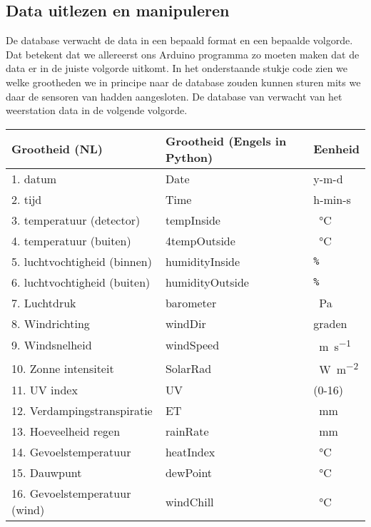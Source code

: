 \subsection{Data uitlezen en manipuleren} De \hisparc database verwacht
de data in een bepaald format en een bepaalde volgorde. Dat betekent dat
we allereerst ons Arduino programma zo moeten maken dat de data er in de
juiste volgorde uitkomt.
In het onderstaande stukje code zien we welke grootheden we in principe naar de 
\hisparc database zouden kunnen sturen mits we daar de sensoren van hadden aangesloten.
De database van \hisparc verwacht van het weerstation data in de volgende 
volgorde. 

\begin{center}
\begin{table}
    \begin{tabular}{ | l | l | l|}
    \hline
    Grootheid (NL)& Grootheid (Engels in Python) & Eenheid  \\ \hline
    1. datum & Date   & y-m-d  \\ \hline
    2. tijd & Time    & h-min-s   \\ \hline
    3. temperatuur (detector) & tempInside & \SI{}{\celsius}    \\ \hline
    4. temperatuur (buiten) & 4tempOutside  & \SI{}{\celsius}    \\ \hline
    5. luchtvochtigheid (binnen)  & humidityInside & \verb|%|     \\ \hline
    6. luchtvochtigheid (buiten) & humidityOutside  & \verb|%|    \\ \hline
    7. Luchtdruk & barometer &  \SI{}{\pascal}   \\ \hline
    8. Windrichting & windDir &  graden \\ \hline
    9. Windsnelheid & windSpeed  &  \SI{}{\meter\per\second} \\ \hline
    10. Zonne intensiteit & SolarRad & \SI{}{\watt\per\square\meter}    \\ \hline
    11. UV index & UV & (0-16)    \\ \hline
    12. Verdampingstranspiratie & ET &  \SI{}{\milli\meter}    \\ \hline
    13. Hoeveelheid regen & rainRate & \SI{}{\milli\meter} \\ \hline
    14. Gevoelstemperatuur & heatIndex & \SI{}{\celsius} \\ \hline
    15. Dauwpunt & dewPoint & \SI{}{\celsius}    \\ \hline
    16. Gevoelstemperatuur (wind) & windChill & \SI{}{\celsius}    \\ \hline

\end{tabular}
\end{table}
\end{center}
